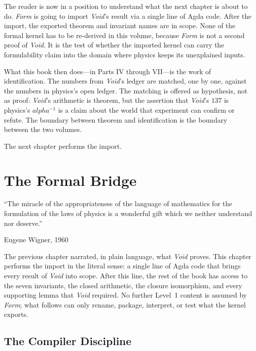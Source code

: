 \documentclass[11pt,a4paper]{book}
\def\alpha{alpha}%
\begin{document}
The reader is now in a position to understand what the next chapter is about to do. \textit{Form} is going to import \textit{Void}'s result via a single line of Agda code. After the import, the exported theorem and invariant names are in scope. None of the formal kernel has to be re-derived in this volume, because \textit{Form} is not a second proof of \textit{Void}. It is the test of whether the imported kernel can carry the formulability claim into the domain where physics keeps its unexplained inputs.

What this book then does---in Parts IV through VII---is the work of identification. The numbers from \textit{Void}'s ledger are matched, one by one, against the numbers in physics's open ledger. The matching is offered as hypothesis, not as proof: \textit{Void}'s arithmetic is theorem, but the assertion that \textit{Void}'s $137$ is physics's $\alpha^{-1}$ is a claim about the world that experiment can confirm or refute. The boundary between theorem and identification is the boundary between the two volumes.

The next chapter performs the import.

\chapter{The Formal Bridge}
\label{ch:the-formal-bridge}

\epigraph{``The miracle of the appropriateness of the language of mathematics for the formulation of the laws of physics is a wonderful gift which we neither understand nor deserve.''}{Eugene Wigner, 1960}

The previous chapter narrated, in plain language, what \textit{Void} proves. This chapter performs the import in the literal sense: a single line of Agda code that brings every result of \textit{Void} into scope. After this line, the rest of the book has access to the seven invariants, the closed arithmetic, the closure isomorphism, and every supporting lemma that \textit{Void} required. No further Level~1 content is assumed by \textit{Form}; what follows can only rename, package, interpret, or test what the kernel exports.

\section*{The Compiler Discipline}
\end{document}

